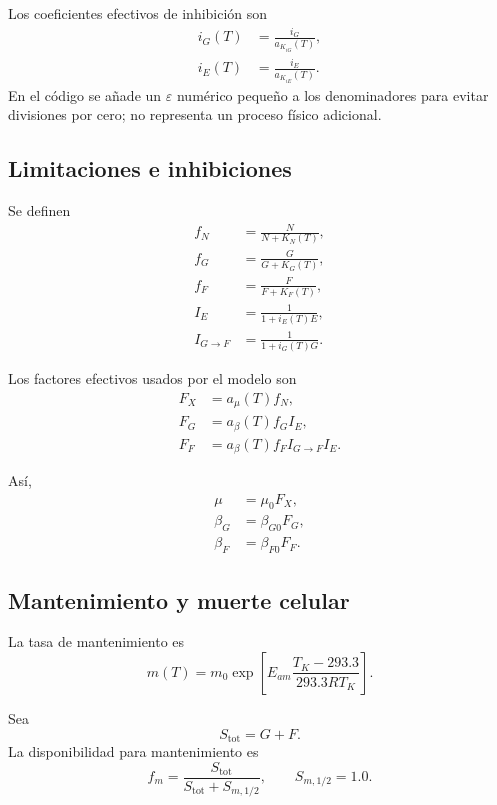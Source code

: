 \documentclass[11pt,a4paper]{article}
\begin{document}
Los coeficientes efectivos de inhibición son
\begin{align}
i_G(T)&=\frac{i_G}{a_{K_{iG}}(T)},\\
i_E(T)&=\frac{i_E}{a_{K_{iE}}(T)}.
\end{align}
En el código se añade un $\varepsilon$ numérico pequeño a los denominadores para evitar divisiones
por cero; no representa un proceso físico adicional.

\subsection{Limitaciones e inhibiciones}

Se definen
\begin{align}
f_N &= \frac{N}{N+K_N(T)},\\
f_G &= \frac{G}{G+K_G(T)},\\
f_F &= \frac{F}{F+K_F(T)},\\
I_E &= \frac{1}{1+i_E(T)E},\\
I_{G\rightarrow F} &= \frac{1}{1+i_G(T)G}.
\end{align}

Los factores efectivos usados por el modelo son
\begin{align}
F_X &= a_\mu(T) f_N,\\
F_G &= a_\beta(T) f_G I_E,\\
F_F &= a_\beta(T) f_F I_{G\rightarrow F} I_E.
\end{align}

Así,
\begin{align}
\mu &= \mu_0 F_X,\\
\beta_G &= \beta_{G0}F_G,\\
\beta_F &= \beta_{F0}F_F.
\end{align}

\subsection{Mantenimiento y muerte celular}

La tasa de mantenimiento es
\begin{equation}
m(T)=
m_0
\exp\left[
E_{am}\frac{T_K-293.3}{293.3RT_K}
\right].
\end{equation}

Sea
\[
S_{\mathrm{tot}}=G+F.
\]
La disponibilidad para mantenimiento es
\begin{equation}
f_m=
\frac{S_{\mathrm{tot}}}
{S_{\mathrm{tot}}+S_{m,1/2}},
\qquad
S_{m,1/2}=1.0.
\end{equation}
\end{document}
